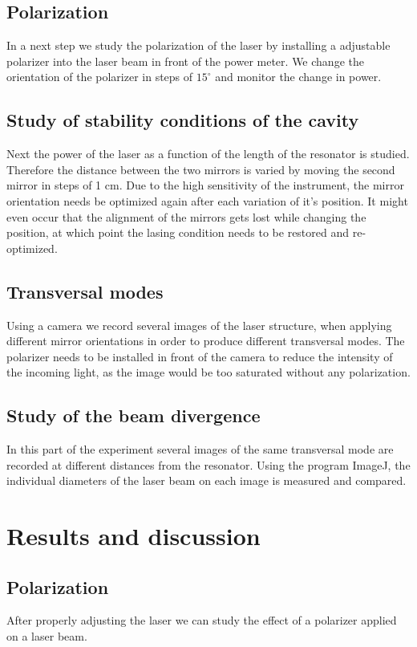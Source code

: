 \documentclass{scrartcl}
\begin{document}
\subsection{Polarization}
In a next step we study the polarization of the laser by installing a adjustable polarizer into the laser beam in front of the power meter. We change the orientation of the polarizer in steps of $15^{\circ}$ and monitor the change in power.

\subsection{Study of stability conditions of the cavity}
Next the power of the laser as a function of the length of the resonator is studied. Therefore the distance between the two mirrors is varied by moving the second mirror in steps of 1 cm. Due to the high sensitivity of the instrument, the mirror orientation needs be optimized again after each variation of it's position. It might even occur that the alignment of the mirrors gets lost while changing the position, at which point the lasing condition needs to be restored and re-optimized. 

\subsection{Transversal modes}
Using a camera we record several images of the laser structure, when applying different mirror orientations in order to produce different transversal modes. The polarizer needs to be installed in front of the camera to reduce the intensity of the incoming light, as the image would be too saturated without any polarization.

\subsection{Study of the beam divergence}
In this part of the experiment several images of the same transversal mode are recorded at different distances from the resonator. Using the program ImageJ, the individual diameters of the laser beam on each image is measured and compared.

\section{Results and discussion}


\subsection{Polarization}
After properly adjusting the laser we can study the effect of a polarizer applied on a laser beam.
\end{document}
